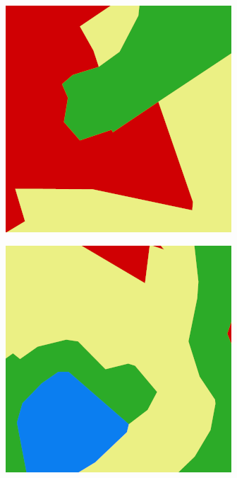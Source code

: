 \begin{figure}
    \hfill
    \begin{subfigure}{\DopLabelImageWidth}
        \includegraphics[width=\textwidth]{images/186_label}
    \end{subfigure}
    \hfill
    \begin{subfigure}{\DopLabelImageWidth}
        \includegraphics[width=\textwidth]{images/583_label}

\end{subfigure}
\end{figure}
